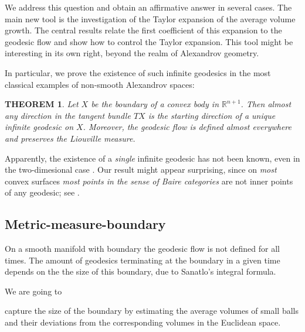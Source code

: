 \documentclass[12pt,leqno,intlimits]{amsart}
\numberwithin{equation}{section}
\newtheorem{thm}{THEOREM}[section]
\theoremstyle{definition}
\theoremstyle{remark}
\begin{document}
We address this question and obtain an affirmative answer in several cases.
{\color {green} The main new tool is the investigation of  the Taylor expansion of the average volume growth.
The central results relate the first coefficient of this expansion to  the geodesic flow and show how to control
the Taylor expansion. This tool  might be interesting in its own right, beyond the realm of Alexandrov geometry}.

In particular, we prove the existence of such infinite geodesics in the most classical examples of non-smooth Alexandrov spaces:

\begin{thm} \label{thmfirst}
Let $X$ be the boundary of a convex body in $\mathbb R^{n+1}$.
Then almost any direction in the tangent bundle $TX$
is the starting direction of a unique infinite geodesic on $X$.
Moreover, the geodesic flow is defined almost everywhere and preserves the Liouville measure.
\end{thm}

Apparently, the existence of a \emph{single} infinite geodesic has not been known, even in the two-dimesional case \cite{Zam-quest}.
Our result might appear
{\color {green}  surprising},
since on \emph{most} convex surfaces \emph{most points in the sense of Baire categories} are not inner points of any geodesic;
see \cite{Zam-inv}.

\subsection{Metric-measure-boundary}
{\color {green} On a smooth manifold with boundary the geodesic flow is not defined for all times. The amount of geodesics terminating at the boundary in a given time depends on the the size of this boundary,  due to Sanatlo's integral  formula.

 We are going to} capture the size of the boundary by estimating the average volumes of small balls and their deviations from the corresponding volumes in the Euclidean space.
\end{document}
